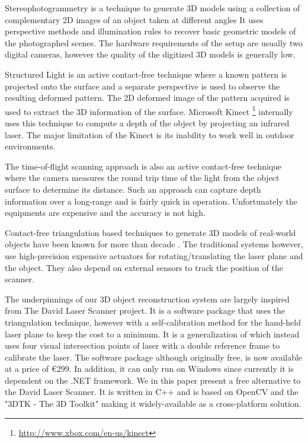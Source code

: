 Stereophotogrammetry \cite{li:2004, debevec:1996} is a technique to generate
3D models using a collection of complementary 2D images of an object taken at
different angles It uses perspective methods and illumination rules to recover
basic geometric models of the photographed scenes. The hardware requirements
of the setup are usually two digital cameras, however the quality of the
digitized 3D models is generally low.

Structured Light is an active contact-free technique where a known pattern is
projected onto the surface and a separate perspective is used to observe the
resulting deformed pattern. The 2D deformed image of the pattern acquired is
used to extract the 3D information of the surface. Microsoft Kinect
\footnote{\href{http://www.xbox.com/en-us/kinect}{http://www.xbox.com/en-us/kinect}}
internally uses this technique to compute a depth of the object by projecting
an infrared laser. The major limitation of the Kinect is its inability to work
well in outdoor environments.

The time-of-flight scanning approach \cite{nielsen:1996} is also
an active contact-free technique where the camera measures the round trip time
of the light from the object surface to determine its distance. Such an
approach can capture depth information over a long-range and is fairly quick
in operation. Unfortunately the equipments are expensive and the accuracy is
not high.

Contact-free triangulation based techniques to generate 3D models of
real-world objects have been known for more than decade \cite{beraldin:1999,
cortelazzo:2004}. The traditional systems however, use high-precision
expensive actuators for rotating/translating the laser plane and the object.
They also depend on external sensors to track the position of the scanner.

The underpinnings of our 3D object reconstruction system are largely inspired
from The David Laser Scanner \cite{winkelbach:2006} project.  It is a software
package that uses the triangulation technique, however with a self-calibration
method for the hand-held laser plane to keep the cost to a minimum. It is a
generalization of \cite{zagorchev:2006} which instead uses four visual
intersection points of laser with a double reference frame to calibrate the
laser. The software package although originally free, is now available at a
price of \euro 299. In addition, it can only run on Windows since currently it
is dependent on the .NET framework. We in this paper present a free
alternative to the David Laser Scanner. It is written in C++ and is based on
OpenCV and the "3DTK - The 3D Toolkit" \cite{3dtk:2012} making it
widely-available as a cross-platform solution.
